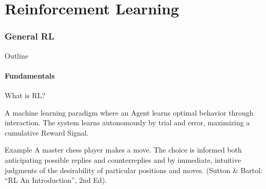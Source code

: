 \documentclass[24pt]{beamer}
\begin{document}
  
\part{Reinforcement Learning}

\begin{frame}
	\partpage
\end{frame}

\section{General RL}

\begin{frame}{Outline}
	\tableofcontents[currentsection]
\end{frame}


\subsection{Fundamentals}

\begin{frame}
	\sectionpage
	\subsectionpage
\end{frame}

\begin{frame}{What is RL?}
	\begin{definition}
		A machine learning paradigm where an Agent \alert{learns} optimal behavior through \alert{interaction}. The system learns autonomously by trial and error, maximizing a cumulative \alert{Reward Signal}.
	\end{definition}
	
	\begin{exampleblock}{Example}
		A master chess player makes a move. The choice is informed both anticipating possible replies and counterreplies and by immediate, intuitive judgments of the desirability of particular positions and moves. (Sutton \& Bartol: ``RL An Introduction'', 2nd Ed).
	\end{exampleblock}
\end{frame}
\end{document}
